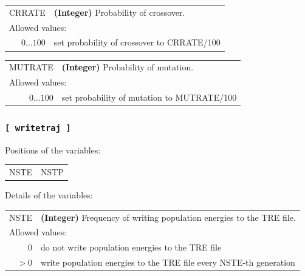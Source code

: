 \documentclass[10pt,a4paper,openany]{memoir}
\numberwithin{equation}{section}
\begin{document}
{
\begin{tabular}{r@{ : }l}
\label{descr:crrate}
    CRRATE&\textbf{(Integer)} Probability of crossover.                                                                 \\ 
\multicolumn{2}{l}{Allowed values:} \\ 
\(0\ldots 100\)&set probability of crossover to CRRATE/100                                                           \\ 
\end{tabular}
\vspace{1ex}
}

{
\begin{tabular}{r@{ : }l}
\label{descr:mutrate}
   MUTRATE&\textbf{(Integer)} Probability of mutation.                                                                  \\ 
\multicolumn{2}{l}{Allowed values:} \\ 
\(0\ldots 100\)&set probability of mutation to MUTRATE/100                                                           \\ 
\end{tabular}
\vspace{1ex}
}

\subsubsection{\texttt{[~writetraj~]}}
\label{sec:inp-writetraj}

Positions of the variables:
\begin{center}
  \begin{tabular}{ll}
    NSTE & NSTP \\
  \end{tabular}
\end{center}

\noindent Details of the variables:
\vspace{2ex}

{
\begin{tabular}{r@{ : }l}
\label{descr:nste}
      NSTE&\textbf{(Integer)} Frequency of writing population energies to the TRE file.                                                \\ 
\multicolumn{2}{l}{Allowed values:} \\ 
     \(0\)&do not write population energies to the TRE file                                                     \\ 
    \(>0\)&write population energies to the TRE file every NSTE-th generation                                   \\ 
\end{tabular}
\vspace{1ex}
}
\end{document}

